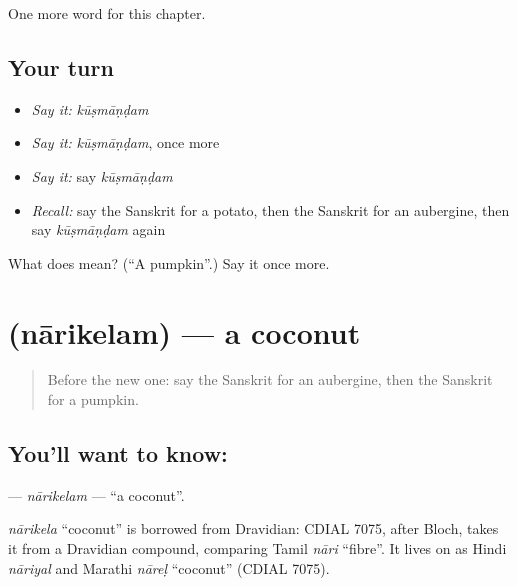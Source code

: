 \begin{grammarlens}[title={What you've built}]
One more word for this chapter.
\end{grammarlens}

\subsection*{Your turn}
\begin{itemize}
\raggedright
  \item \emph{Say it:} \emph{kūṣmāṇḍam}
  \item \emph{Say it:} \emph{kūṣmāṇḍam}, once more
  \item \emph{Say it:} say \emph{kūṣmāṇḍam}
  \item \emph{Recall:} say the Sanskrit for a potato, then the Sanskrit for an aubergine, then say \emph{kūṣmāṇḍam} again
\end{itemize}

\begin{tcolorbox}[breakable,colback=teal!4,colframe=teal!35!black,title={Before you move on}]
What does  mean? (\textquotedblleft{}A pumpkin\textquotedblright{}.) Say it once more.
\end{tcolorbox}
\section[\texorpdfstring{\sk{नारिकेलम्} (nārikelam)}{नारिकेलम् (nārikelam)}]{ (nārikelam) — a coconut}

\label{lesson:SA-C108-narikelam}



\begin{quote}
Before the new one: say the Sanskrit for an aubergine, then the Sanskrit for a pumpkin.
\end{quote}

\subsection*{You'll want to know: }
\textbf{} — \emph{nārikelam} — \textquotedblleft{}a coconut\textquotedblright{}.

\begin{cousinweb}
\emph{nārikela} \textquotedblleft{}coconut\textquotedblright{} is borrowed from Dravidian: CDIAL 7075, after Bloch, takes it from a Dravidian compound, comparing Tamil \emph{nāri} \textquotedblleft{}fibre\textquotedblright{}. It lives on as Hindi \emph{nāriyal} and Marathi \emph{nāreḷ} \textquotedblleft{}coconut\textquotedblright{} (CDIAL 7075).
\end{cousinweb}

